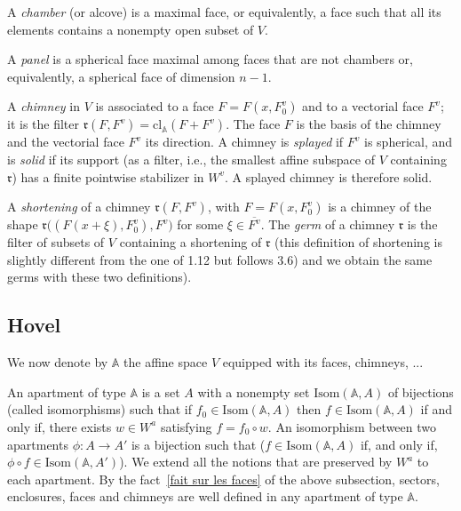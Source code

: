\documentclass[12pt]{article}
\theoremstyle{plain}
\theoremstyle{definition}
\newcommand{\A}{\mathbb{A}}
\begin{document}
A \textit{chamber} (or alcove) is a maximal face, or equivalently, a face such that all its elements contains a nonempty open subset of $V$.

A \textit{panel} is a spherical face maximal among faces that are not chambers or, equivalently, a spherical face of dimension $n-1$.

A \textit{chimney} in $V$ is associated to a face $F=F(x,F_0^v)$ and to a vectorial face $F^v$; it is the filter $\mathfrak{r}(F,F^v)=\mathrm{cl}_\mathbb{A}(F+F^v)$. The face $F$ is the basis of the chimney and the vectorial face $F^v$ its direction. A chimney is \textit{splayed} if $F^v$ is spherical, and is \textit{solid} if its support (as a filter, i.e., the smallest affine subspace of $V$  containing $\mathfrak{r}$) has a finite pointwise stabilizer in $W^v$. A splayed chimney is therefore solid. 

A \textit{shortening} of a chimney $\mathfrak{r}(F,F^v)$, with $F=F(x,F_0^v)$ is a chimney of the shape $\mathfrak{r} \big((F(x+\xi),F_0^v),F^v\big)$ for some $\xi\in \overline{F^v}$. The \textit{germ} of a chimney $\mathfrak{r}$ is the filter of subsets of $V$ containing a shortening of $\mathfrak{r}$ (this definition of shortening is slightly different from the one of \cite{rousseau2011masures} 1.12 but follows \cite{rousseau2012almost} 3.6) and we obtain the same germs with these two definitions).




\subsection{Hovel}
We now denote by $\A$ the affine space $V$ equipped with its faces, chimneys, ...


An apartment of type $\A$ is a set $A$ with a nonempty set $\mathrm{Isom}(\A,A)$ of bijections (called isomorphisms) such that if $f_0\in \mathrm{Isom}(\A,A)$ then $f\in \mathrm{Isom}(\A,A)$ if and only if, there exists $w\in W^a$ satisfying $f=f_0\circ w$. An isomorphism between two apartments $\phi:A\rightarrow A'$ is a bijection such that ($f\in \mathrm{Isom}(\mathbb{A},A)$ if, and only if, $\phi \circ f\in \mathrm{Isom}(\A,A')$). We extend all the notions that are preserved by $W^a$ to each apartment. By the fact~\ref{fait sur les faces} of the above subsection, sectors, enclosures, faces and chimneys are well defined in any apartment of type $\A$.
\end{document}
